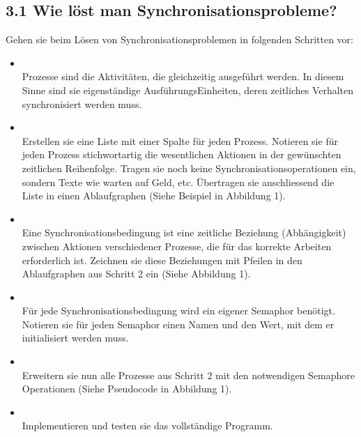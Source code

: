 \documentclass[a4paper,10pt,english]{report}
\begin{document}
\subsection{3.1	Wie löst man Synchronisationsprobleme?}
\label{\detokenize{P08_Sync/README:wie-lost-man-synchronisationsprobleme}}
\sphinxAtStartPar
Gehen sie beim Lösen von Synchronisationsproblemen in folgenden Schritten vor:
\begin{itemize}
\item {} 
\sphinxAtStartPar
{}\\
Prozesse sind die Aktivitäten, die gleichzeitig ausgeführt werden. In diesem Sinne sind sie eigenständige Ausführungs\sphinxhyphen{}Einheiten, deren zeitliches Verhalten synchronisiert werden muss.

\item {} 
\sphinxAtStartPar
{}\\
Erstellen sie eine Liste mit einer Spalte für jeden Prozess. Notieren sie für jeden Prozess stichwortartig die wesentlichen Aktionen in der gewünschten zeitlichen Reihenfolge. Tragen sie noch keine Synchronisationsoperationen ein, sondern Texte wie warten auf Geld, etc. Übertragen sie anschliessend die Liste in einen Ablaufgraphen (Siehe Beispiel in Abbildung 1).

\item {} 
\sphinxAtStartPar
{}\\
Eine Synchronisationsbedingung ist eine zeitliche Beziehung (Abhängigkeit) zwischen Aktionen verschiedener Prozesse, die für das korrekte Arbeiten erforderlich ist. Zeichnen sie diese Beziehungen mit Pfeilen in den Ablaufgraphen aus Schritt 2 ein (Siehe Abbildung 1).

\item {} 
\sphinxAtStartPar
{}\\
Für jede Synchronisationsbedingung wird ein eigener Semaphor benötigt. Notieren sie für jeden Semaphor einen Namen und den Wert, mit dem er initialisiert werden muss.

\item {} 
\sphinxAtStartPar
{}\\
Erweitern sie nun alle Prozesse aus Schritt 2 mit den notwendigen Semaphore Operati\sphinxhyphen{}onen (Siehe Pseudocode in Abbildung 1).

\item {} 
\sphinxAtStartPar
{}\\
Implementieren und testen sie das vollständige Programm.

\end{itemize}
\end{document}
